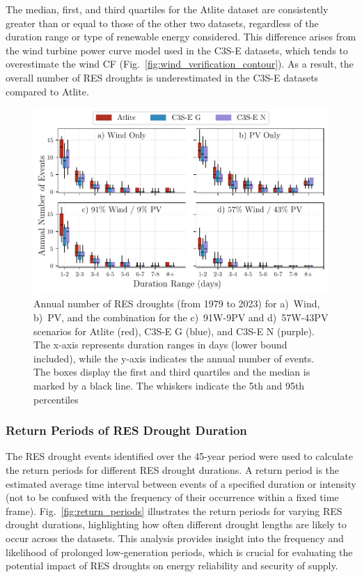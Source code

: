 \documentclass[preprint, 12pt]{elsarticle}
\begin{document}
The median, first, and third quartiles for the Atlite dataset are consistently greater than or equal to those of the other two datasets, regardless of the duration range or type of renewable energy considered. This difference arises from the wind turbine power curve model used in the C3S-E datasets, which tends to overestimate the wind CF (Fig.~\ref{fig:wind_verification_contour}). As a result, the overall number of RES droughts is underestimated in the C3S-E datasets compared to Atlite. 

\begin{figure}[!ht]
	\centering
	\includegraphics[width=\textwidth]{droughts_number_events.pdf}
	\caption{Annual number of RES droughts (from 1979 to 2023) for a)~Wind, b)~PV, and the combination for the c)~91W-9PV and d)~57W-43PV scenarios for Atlite (red), C3S-E G (blue), and C3S-E N (purple). The x-axis represents duration ranges in days (lower bound included), while the y-axis indicates the annual number of events. The boxes display the first and third quartiles and the median is marked by a black line. The whiskers indicate the 5th and 95th percentiles}
	\label{fig:boxplot_number_events}	
\end{figure}

\newpage
\subsubsection{Return Periods of RES Drought Duration}

The RES drought events identified over the 45-year period were used to calculate the return periods for different RES drought durations. A return period is the estimated average time interval between events of a specified duration or intensity (not to be confused with the frequency of their occurrence within a fixed time frame). Fig.~\ref{fig:return_periods} illustrates the return periods for varying RES drought durations, highlighting how often different drought lengths are likely to occur across the datasets. This analysis provides insight into the frequency and likelihood of prolonged low-generation periods, which is crucial for evaluating the potential impact of RES droughts on energy reliability and security of supply.
\end{document}
